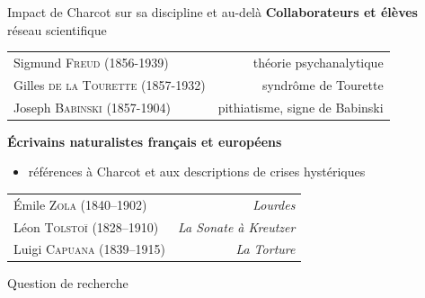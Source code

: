 \begin{frame}{Impact de Charcot sur sa discipline et au-delà}
\centering
\textbf{Collaborateurs et élèves}\\
{\small \og{}réseau scientifique\fg{}}
    \begin{table}[!ht]
        \centering
        \small
        \begin{tabular}{l r}
           Sigmund \textsc{Freud} (1856-1939)  & théorie psychanalytique \\
            Gilles \textsc{de la Tourette} (1857-1932) & syndrôme de Tourette \\
            Joseph \textsc{Babinski} (1857-1904) & pithiatisme, signe de Babinski \\
        \end{tabular}
        \begin{flushright}
        \footnotesize\citep{BROUSSOLLE2012301}
        \end{flushright}
        \label{tab:my_label}
    \end{table}
\medskip
\textbf{Écrivains naturalistes français et européens} 
\begin{itemize}
\centering
\small \item références à Charcot et aux descriptions de crises hystériques
\end{itemize}
\begin{table}[!ht]
    \centering
    \small
    \begin{tabular}{l r}
        Émile \textsc{Zola} (1840–1902)  & \textit{Lourdes} \\
        Léon \textsc{Tolstoï} (1828–1910) & \textit{La Sonate à Kreutzer} \\
        Luigi \textsc{Capuana} (1839–1915) & \textit{La Torture}
    \end{tabular}
            \begin{flushright}
        \footnotesize\citep{koehler2013charcot}
        \end{flushright}
    \label{tab:my_label}
\end{table}

\end{frame}

\begin{frame}{Question de recherche}
\begin{exampleblock}{}
\centering
\end{exampleblock}

\end{frame}
